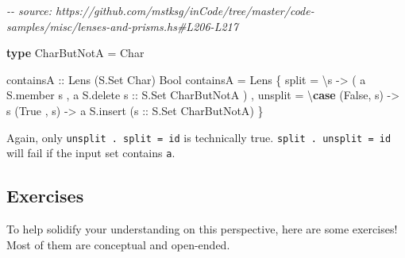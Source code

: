 \documentclass[]{article}
\newenvironment{Shaded}{}{}
\newcommand{\CharTok}[1]{\textcolor[rgb]{0.25,0.44,0.63}{#1}}
\newcommand{\CommentTok}[1]{\textcolor[rgb]{0.38,0.63,0.69}{\textit{#1}}}
\newcommand{\DataTypeTok}[1]{\textcolor[rgb]{0.56,0.13,0.00}{#1}}
\newcommand{\KeywordTok}[1]{\textcolor[rgb]{0.00,0.44,0.13}{\textbf{#1}}}
\newcommand{\NormalTok}[1]{#1}
\newcommand{\OtherTok}[1]{\textcolor[rgb]{0.00,0.44,0.13}{#1}}
\begin{document}
\begin{Shaded}
\begin{Highlighting}[]
\CommentTok{{-}{-} source: https://github.com/mstksg/inCode/tree/master/code{-}samples/misc/lenses{-}and{-}prisms.hs\#L206{-}L217}

\KeywordTok{type} \DataTypeTok{CharButNotA} \OtherTok{=} \DataTypeTok{Char}

\OtherTok{containsA ::} \DataTypeTok{Lens\textquotesingle{}}\NormalTok{ (}\DataTypeTok{S.Set} \DataTypeTok{Char}\NormalTok{) }\DataTypeTok{Bool}
\NormalTok{containsA }\OtherTok{=} \DataTypeTok{Lens\textquotesingle{}}
\NormalTok{    \{ split   }\OtherTok{=}\NormalTok{ \textbackslash{}s }\OtherTok{{-}\textgreater{}}
\NormalTok{        ( }\CharTok{\textquotesingle{}a\textquotesingle{}} \OtherTok{\textasciigrave{}S.member\textasciigrave{}}\NormalTok{ s}
\NormalTok{        , }\CharTok{\textquotesingle{}a\textquotesingle{}} \OtherTok{\textasciigrave{}S.delete\textasciigrave{} s      ::} \DataTypeTok{S.Set} \DataTypeTok{CharButNotA}
\NormalTok{        )}
\NormalTok{    , unsplit }\OtherTok{=}\NormalTok{ \textbackslash{}}\KeywordTok{case}
\NormalTok{        (}\DataTypeTok{False}\NormalTok{, s) }\OtherTok{{-}\textgreater{}}\NormalTok{ s}
\NormalTok{        (}\DataTypeTok{True}\NormalTok{ , s) }\OtherTok{{-}\textgreater{}} \CharTok{\textquotesingle{}a\textquotesingle{}} \OtherTok{\textasciigrave{}S.insert\textasciigrave{}}\NormalTok{ (}\OtherTok{s ::} \DataTypeTok{S.Set} \DataTypeTok{CharButNotA}\NormalTok{)}
\NormalTok{    \}}
\end{Highlighting}
\end{Shaded}

Again, only \texttt{unsplit\ .\ split\ =\ id} is technically true.
\texttt{split\ .\ unsplit\ =\ id} will fail if the input set contains
\texttt{\textquotesingle{}a\textquotesingle{}}.

\subsection{Exercises}\label{exercises}

To help solidify your understanding on this perspective, here are some
exercises! Most of them are conceptual and open-ended.
\end{document}
